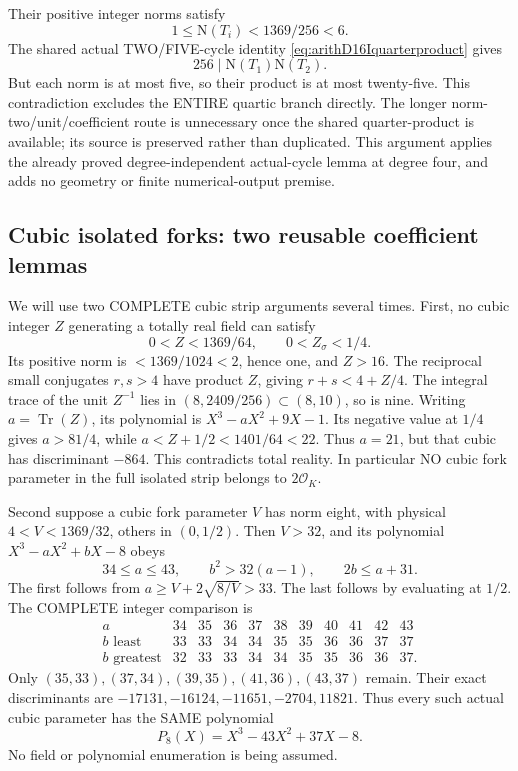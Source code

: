 \documentclass[11pt]{article}
\begin{document}
Their positive integer norms satisfy
\[
                          1\le\mathrm N(T_i)<1369/256<6 .
\]
The shared actual TWO/FIVE-cycle identity
\eqref{eq:arithD16Iquarterproduct} gives
\[
                           256\mid\mathrm N(T_1)\mathrm N(T_2).
\]
But each norm is at most five, so
their product is at most twenty-five.
This contradiction excludes the ENTIRE
quartic branch directly.
The longer norm-two/unit/coefficient
route is unnecessary once the shared
quarter-product is available; its source
is preserved rather than duplicated.
This argument applies the already proved
degree-independent actual-cycle lemma
at degree four, and adds no geometry
or finite numerical-output premise.

\subsection{Cubic isolated forks: two reusable coefficient lemmas}
\label{app:arithD16Icubiclemmas}

We will use two COMPLETE cubic strip
arguments several times.
First, no cubic integer \(Z\) generating
a totally real field can satisfy
\[
                   0<Z<1369/64,\qquad0<Z_\sigma<1/4 .
\]
Its positive norm is \(<1369/1024<2\),
hence one, and \(Z>16\).
The reciprocal small conjugates \(r,s>4\)
have product \(Z\), giving
\(r+s<4+Z/4\).
The integral trace of the unit \(Z^{-1}\)
lies in \((8,2409/256)\subset(8,10)\),
so is nine.
Writing \(a=\operatorname{Tr}(Z)\),
its polynomial is \(X^3-aX^2+9X-1\).
Its negative value at \(1/4\) gives
\(a>81/4\), while
\(a<Z+1/2<1401/64<22\).
Thus \(a=21\), but that cubic has
discriminant \(-864\).
This contradicts total reality.
In particular NO cubic fork parameter
in the full isolated strip belongs
to \(2\mathcal O_K\).

Second suppose a cubic fork parameter
\(V\) has norm eight, with physical
\(4<V<1369/32\), others in \((0,1/2)\).
Then \(V>32\), and its polynomial
\(X^3-aX^2+bX-8\) obeys
\[
                   34\le a\le43,\qquad
                   b^2>32(a-1),\qquad2b\le a+31 .
\]
The first follows from
\(a\ge V+2\sqrt{8/V}>33\).
The last follows by evaluating at
\(1/2\).
The COMPLETE integer comparison is
\[
\begin{array}{c|rrrrrrrrrr}
a&34&35&36&37&38&39&40&41&42&43\\ \hline
b\text{ least}&33&33&34&34&35&35&36&36&37&37\\
b\text{ greatest}&32&33&33&34&34&35&35&36&36&37 .
\end{array}
\]
Only \((35,33),(37,34),(39,35),
(41,36),(43,37)\) remain.
Their exact discriminants are
\(-17131,-16124,-11651,-2704,11821\).
Thus every such actual cubic parameter
has the SAME polynomial
\[
                               P_8(X)=X^3-43X^2+37X-8 .
\tag{D16IP8}\label{eq:arithD16Icubicnormeight}
\]
No field or polynomial enumeration
is being assumed.
\end{document}
